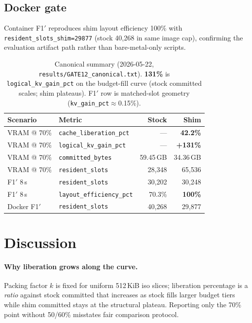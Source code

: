 \documentclass[11pt]{article}
\begin{document}
\subsection{Docker gate}
Container F1$'$ reproduces shim layout efficiency 100\% with \texttt{resident\_slots\_shim=29877} (stock 40{,}268 in same image cap), confirming the evaluation artifact path rather than bare-metal-only scripts.

\begin{table}[ht]
\centering
\caption{Canonical summary (2026-05-22, \texttt{results/GATE12\_canonical.txt}).
\textbf{131\%} is \texttt{logical\_kv\_gain\_pct} on the budget-fill curve (stock committed scales; shim plateaus).
F1$'$ row is matched-slot geometry (\texttt{kv\_gain\_pct}$\approx$0.15\%).}
\label{tab:canonical}
\begin{tabular}{@{}llrr@{}}
\toprule
Scenario & Metric & Stock & Shim \\
\midrule
VRAM @ 70\% & \texttt{cache\_liberation\_pct} & --- & \textbf{42.2\%} \\
VRAM @ 70\% & \texttt{logical\_kv\_gain\_pct} & --- & \textbf{+131\%} \\
VRAM @ 70\% & \texttt{committed\_bytes} & 59.45\,GB & 34.36\,GB \\
VRAM @ 70\% & \texttt{resident\_slots} & 28,348 & 65,536 \\
F1$'$ 8\,s & \texttt{resident\_slots} & 30,202 & 30,248 \\
F1$'$ 8\,s & \texttt{layout\_efficiency\_pct} & 70.3\% & \textbf{100\%} \\
Docker F1$'$ & \texttt{resident\_slots} & 40,268 & 29,877 \\
\bottomrule
\end{tabular}
\end{table}

\section{Discussion}

\paragraph{Why liberation grows along the curve.}
Packing factor $k$ is fixed for uniform 512\,KiB iso slices; liberation percentage is a \emph{ratio} against stock committed that increases as stock fills larger budget tiers while shim committed stays at the structural plateau.
Reporting only the 70\% point without 50/60\% misstates fair comparison protocol.
\end{document}

